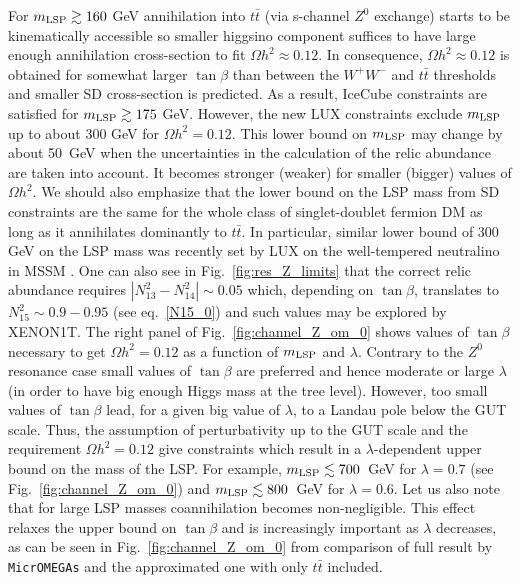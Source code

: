 \documentclass[12pt,twoside]{article}
\begin{document}
For $m_{\rm LSP}\gtrsim 160$ GeV annihilation into $t\bar{t}$ (via s-channel $Z^0$ exchange) starts to be 
kinematically accessible so smaller higgsino component suffices to have large enough annihilation cross-section to fit $\Omega h^2\approx0.12$. In
consequence, $\Omega h^2\approx0.12$ is obtained for somewhat larger $\tan\beta$ than between the $W^+W^-$ and $t\bar{t}$ thresholds and smaller SD
cross-section is predicted. As a result, IceCube \cite{IceCubeNEW} constraints are satisfied for $m_{\rm LSP}\gtrsim 175$ GeV. However, the new LUX
constraints exclude $m_{\rm LSP}$ up to about 300 GeV for $\Omega h^2=0.12$. 
This lower bound on $m_{\rm LSP}$ may change by about 50~GeV when the 
uncertainties in the calculation of the relic abundance are taken into account. 
It becomes stronger (weaker) for smaller (bigger) values of $\Omega h^2$.
We should also emphasize that the lower bound on the LSP mass from SD 
constraints are the same for the whole class of singlet-doublet fermion DM 
as long as it annihilates dominantly to $t\bar{t}$. In particular, similar 
lower bound of 300 GeV on the LSP mass was recently set by LUX on the 
well-tempered neutralino in MSSM \cite{welltemperedBOS}. 
One can also see in Fig.~\ref{fig:res_Z_limits} that the correct
relic abundance requires 
$|N_{13}^2-N_{14}^2|\sim 0.05$ which, depending on $\tan\beta$, translates to 
$N_{15}^2\sim 0.9-0.95$ (see eq.~\eqref{N15_0}) and such values may be 
explored by XENON1T. 
The right panel of Fig.~\ref{fig:channel_Z_om_0} shows values of $\tan\beta$ 
necessary to get $\Omega h^2=0.12$ as a function of $m_{\rm LSP}$ 
and $\lambda$. Contrary to the $Z^0$ resonance case small values of $\tan\beta$ 
are preferred and hence moderate or large $\lambda$ (in order to have 
big enough Higgs mass at the tree level). 
However, too small values of $\tan\beta$ lead, for a given big value of 
$\lambda$, to a Landau pole below the GUT scale. Thus, the assumption of 
perturbativity up to the GUT scale and the requirement $\Omega h^2=0.12$
give constraints which result in a $\lambda$-dependent upper bound on the 
mass of the LSP. For example, $m_{\rm LSP}\lesssim700$~GeV 
for $\lambda=0.7$ (see Fig.~\ref{fig:channel_Z_om_0}) 
and $m_{\rm LSP}\lesssim800$~GeV for $\lambda=0.6$. 
Let us also note that for large LSP masses coannihilation becomes non-negligible. This effect relaxes the upper bound on $\tan\beta$ and is
increasingly important as $\lambda$ decreases, as can be seen  in Fig.~\ref{fig:channel_Z_om_0} from comparison of full result by {\tt MicrOMEGAs} and
the approximated one with only $t\bar{t}$ included. 
\end{document}
